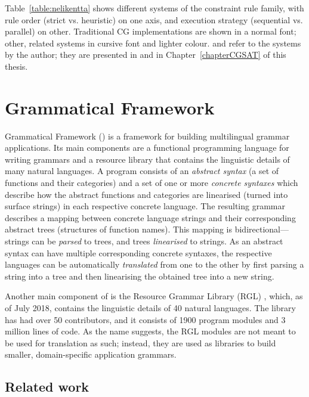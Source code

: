 Table~\ref{table:nelikentta} shows different systems of the constraint
rule family, with rule order (strict vs. heuristic) on one axis, and
execution strategy (sequential vs. parallel) on other.  Traditional CG
implementations are shown in a normal font; other, related systems in
cursive font and lighter colour.  \satcgMax and \satcgOrd refer to the
systems by the author; they are presented in
\cite{listenmaa_claessen2015} and in Chapter~\ref{chapterCGSAT} of
this thesis.


\section{Grammatical Framework}
\label{sec:gf-intro}

Grammatical Framework (\gf{}) \cite{ranta2011gfbook} is a framework for
building multilingual grammar applications. Its main components are a
functional programming language for writing grammars and a resource
library that contains the linguistic details of many natural
languages.  A \gf{} program consists of an \emph{abstract syntax} (a set
of functions and their categories) and a set of one or more
\emph{concrete syntaxes} which describe how the abstract functions and
categories are linearised (turned into surface strings) in each
respective concrete language. The resulting grammar describes a
mapping between concrete language strings and their corresponding
abstract trees (structures of function names).  This mapping is
bidirectional---strings can be \emph{parsed} to trees, and trees
\emph{linearised} to strings.  As an abstract syntax can have multiple
corresponding concrete syntaxes, the respective languages can be
automatically \emph{translated} from one to the other by first parsing
a string into a tree and then linearising the obtained tree into a new
string.

Another main component of \gf{} is the Resource Grammar Library (RGL)
\cite{ranta2009rgl}, which, as of July 2018, contains the linguistic
details of 40 natural languages. The library has had over 50
contributors, and it consists of 1900 program modules and 3 million
lines of code. As the name suggests, the RGL modules are not meant to
be used for translation as such; instead, they are used as libraries
to build smaller, domain-specific application grammars.

\subsection{Related work}

